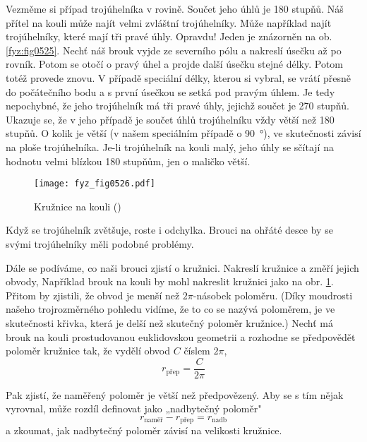     Vezměme si případ trojúhelníka v rovině. Součet jeho úhlů je \num{180} stupňů. Náš přítel na 
    kouli může najít velmi zvláštní trojúhelníky. Může například najít trojúhelníky, které mají tři 
    pravé úhly. Opravdu! Jeden je znázorněn na ob. \ref{fyz:fig0525}. Nechť náš brouk vyjde ze 
    severního pólu a nakreslí úsečku až po rovník. Potom se otočí o pravý úhel a projde další 
    úsečku stejné délky. Potom totéž provede znovu. V případě speciální délky, kterou si vybral, se 
    vrátí přesně do počátečního bodu a s první úsečkou se setká pod pravým úhlem. Je tedy 
    nepochybné, že jeho trojúhelník má tři pravé úhly, jejichž součet je \num{270} stupňů. Ukazuje 
    se, že v jeho případě je součet úhlů trojúhelníku vždy větší než \num{180} stupňů. O kolik je 
    větší (v našem speciálním případě o \qty{90}{\degree}), ve skutečnosti závisí na ploše 
    trojúhelníka. Je-li trojúhelník na kouli malý, jeho úhly se sčítají na hodnotu velmi blízkou 
    \num{180} stupňům, jen o maličko větší.
    
    \begin{figure}[ht!] %
      \centering
      \texttt{[image: fyz\_fig0526.pdf]}
      \caption{Kružnice na kouli (\cite[s.~779]{Feynman02})}
      \label{fyz:fig0526}
    \end{figure}
     
    Když se trojúhelník zvětšuje, roste i odchylka. Brouci na ohřáté desce by se svými trojúhelníky 
    měli podobné problémy.
    
    Dále se podíváme, co naši brouci zjistí o kružnici. Nakreslí kružnice a změří jejich obvody, 
    Například brouk na kouli by mohl nakreslit kružnici jako na obr. \ref{fyz:fig0526}. Přitom by 
    zjistili, že obvod je menší než \(2\pi\)-násobek poloměru. (Díky moudrosti našeho 
    trojrozměrného pohledu vidíme, že to co se nazývá poloměrem, je ve skutečnosti křivka, která je 
    delší než skutečný poloměr kružnice.) Nechť má brouk na kouli prostudovanou euklidovskou 
    geometrii a rozhodne se předpovědět poloměr kružnice tak, že vydělí obvod \(C\) číslem \(2\pi\),
    \begin{equation}\label{fyz:eq528}
      r_{\text{přep}} = \dfrac{C}{2\pi}
    \end{equation}
    
    Pak zjistí, že naměřený poloměr je větší než předpovězený. Aby se s tím nějak vyrovnal, může 
    rozdíl definovat jako „nadbytečný poloměr"
    \begin{equation}\label{fyz:eq529}
      r_{\text{naměř}} - r_{\text{přep}} = r_{\text{nadb}}
    \end{equation}
    a zkoumat, jak nadbytečný poloměr závisí na velikosti kružnice. 
    
